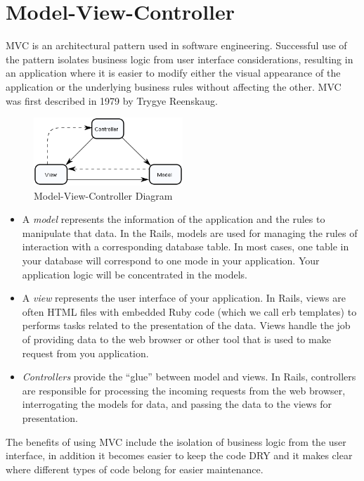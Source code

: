 \section{Model-View-Controller} 
MVC is an architectural pattern used in software engineering. 
Successful use of the pattern isolates business logic from user interface considerations, 
resulting in an application where it is easier to modify either the visual appearance of the application 
or the underlying business rules without affecting the other.
MVC was first described in 1979 by Trygye Reenskaug.

\begin{figure}[h!]
  \caption{Model-View-Controller Diagram}
  \centering
  \includegraphics[width=0.5\textwidth]{Images/ModelViewController}
\end{figure}

\begin{itemize}
\item A \emph{model} represents the information of the application and the rules to manipulate that data. In the Rails, models are used for managing the rules of interaction with a corresponding database table. In most cases, one table in your database will correspond to one mode in your application. Your application logic will be concentrated in the models.
\item A \emph{view} represents the user interface of your application. In Rails, views are often HTML files with embedded Ruby code (which we call erb templates) to performs tasks related to the presentation of the data. Views handle the job of providing data to the web browser or other tool that is used to make request from you application.
\item \emph{Controllers} provide the “glue” between model and views. In Rails, controllers are responsible for processing the incoming requests from the web browser, interrogating the models for data, and passing the data to the views for presentation.
\end{itemize}

The benefits of using MVC include the isolation of business logic from the user interface,
in addition it becomes easier to keep the code DRY and 
it makes clear where different types of code belong for easier maintenance.




